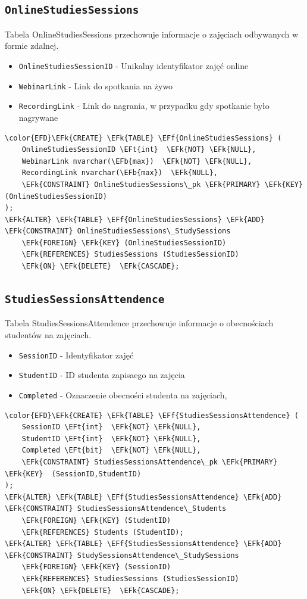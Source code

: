\documentclass[11pt]{article}
\newcommand{\EFk}[1]{\textcolor{EFk}{\textbf{#1}}} %
\newcommand{\EFb}[1]{\textcolor{EFb}{\textbf{#1}}} %
\newcommand{\EFf}[1]{\textcolor{EFf}{#1}} %
\newcommand{\EFt}[1]{\textcolor{EFt}{\textbf{#1}}} %
\begin{document}
\subsection{\texttt{OnlineStudiesSessions}}
\label{sec:orgf51a18b}
Tabela OnlineStudiesSessions przechowuje informacje o zajęciach odbywanych w formie zdalnej.
\begin{itemize}
\item \texttt{OnlineStudiesSessionID} - Unikalny identyfikator zajęć online
\item \texttt{WebinarLink} - Link do spotkania na żywo
\item \texttt{RecordingLink} - Link do nagrania, w przypadku gdy spotkanie było nagrywane
\end{itemize}
\begin{Code}
\begin{Verbatim}
\color{EFD}\EFk{CREATE} \EFk{TABLE} \EFf{OnlineStudiesSessions} (
    OnlineStudiesSessionID \EFt{int}  \EFk{NOT} \EFk{NULL},
    WebinarLink nvarchar(\EFb{max})  \EFk{NOT} \EFk{NULL},
    RecordingLink nvarchar(\EFb{max})  \EFk{NULL},
    \EFk{CONSTRAINT} OnlineStudiesSessions\_pk \EFk{PRIMARY} \EFk{KEY}  (OnlineStudiesSessionID)
);
\EFk{ALTER} \EFk{TABLE} \EFf{OnlineStudiesSessions} \EFk{ADD} \EFk{CONSTRAINT} OnlineStudiesSessions\_StudySessions
    \EFk{FOREIGN} \EFk{KEY} (OnlineStudiesSessionID)
    \EFk{REFERENCES} StudiesSessions (StudiesSessionID)
    \EFk{ON} \EFk{DELETE}  \EFk{CASCADE};
\end{Verbatim}
\end{Code}
\subsection{\texttt{StudiesSessionsAttendence}}
\label{sec:org937e5d6}
Tabela StudiesSessionsAttendence przechowuje informacje o obecnościach studentów na zajęciach.
\begin{itemize}
\item \texttt{SessionID} - Identyfikator zajęć
\item \texttt{StudentID} - ID studenta zapisaego na zajęcia
\item \texttt{Completed} - Oznaczenie obecności studenta na zajęciach,
\end{itemize}
\begin{Code}
\begin{Verbatim}
\color{EFD}\EFk{CREATE} \EFk{TABLE} \EFf{StudiesSessionsAttendence} (
    SessionID \EFt{int}  \EFk{NOT} \EFk{NULL},
    StudentID \EFt{int}  \EFk{NOT} \EFk{NULL},
    Completed \EFt{bit}  \EFk{NOT} \EFk{NULL},
    \EFk{CONSTRAINT} StudiesSessionsAttendence\_pk \EFk{PRIMARY} \EFk{KEY}  (SessionID,StudentID)
);
\EFk{ALTER} \EFk{TABLE} \EFf{StudiesSessionsAttendence} \EFk{ADD} \EFk{CONSTRAINT} StudiesSessionsAttendence\_Students
    \EFk{FOREIGN} \EFk{KEY} (StudentID)
    \EFk{REFERENCES} Students (StudentID);
\EFk{ALTER} \EFk{TABLE} \EFf{StudiesSessionsAttendence} \EFk{ADD} \EFk{CONSTRAINT} StudySessionsAttendence\_StudySessions
    \EFk{FOREIGN} \EFk{KEY} (SessionID)
    \EFk{REFERENCES} StudiesSessions (StudiesSessionID)
    \EFk{ON} \EFk{DELETE}  \EFk{CASCADE};
\end{Verbatim}
\end{Code}
\end{document}

